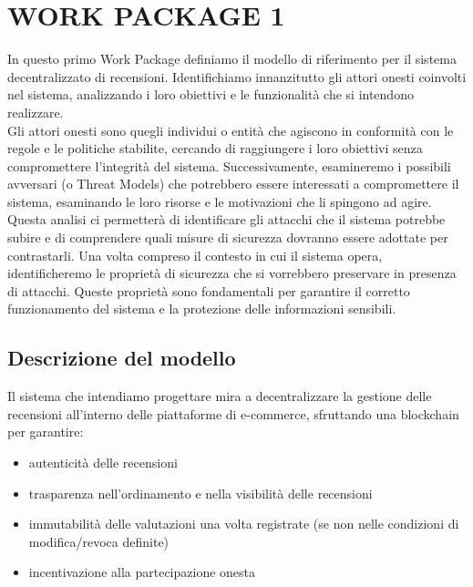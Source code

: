 \chapter{WORK PACKAGE 1}
    In questo primo Work Package definiamo il modello di riferimento per il sistema decentralizzato di recensioni. Identifichiamo innanzitutto gli attori onesti coinvolti nel sistema, analizzando i loro obiettivi e le funzionalità che si intendono realizzare. \\
    Gli attori onesti sono quegli individui o entità che agiscono in conformità con le regole e le politiche stabilite, cercando di raggiungere i loro obiettivi senza compromettere l'integrità del sistema.
    Successivamente, esamineremo i possibili avversari (o Threat Models) che potrebbero essere interessati a compromettere il sistema, esaminando le loro risorse e le motivazioni che li spingono ad agire.
    Questa analisi ci permetterà di identificare gli attacchi che il sistema potrebbe subire e di comprendere quali misure di sicurezza dovranno essere adottate per contrastarli.
    Una volta compreso il contesto in cui il sistema opera, identificheremo le proprietà di sicurezza che si vorrebbero preservare in presenza di attacchi.
    Queste proprietà sono fondamentali per garantire il corretto funzionamento del sistema e la protezione delle informazioni sensibili.
    
    \section{Descrizione del modello}
        Il sistema che intendiamo progettare mira a decentralizzare la gestione delle recensioni all'interno delle piattaforme di e-commerce, sfruttando una blockchain per garantire:
            \begin{itemize}
                \item autenticità delle recensioni
        
                \item trasparenza nell'ordinamento e nella visibilità delle recensioni
        
                \item immutabilità delle valutazioni una volta registrate (se non nelle condizioni di modifica/revoca definite)
        
                \item incentivazione alla partecipazione onesta
            \end{itemize}
        

